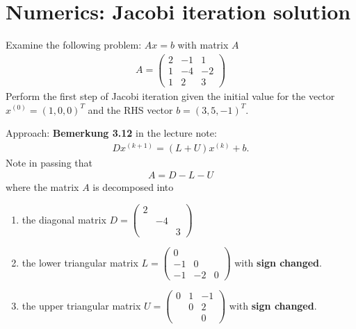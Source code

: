\documentclass[12pt]{article}
\begin{document}
\section{Numerics: Jacobi iteration solution}
\begin{example}
	Examine the following problem: $Ax = b$ with matrix $A$
	\begin{align}
		A =
		\begin{pmatrix}
			2 & -1 & 1  \\
			1 & -4 & -2 \\
			1 & 2  & 3
		\end{pmatrix}
	\end{align}
	Perform the first step of Jacobi iteration given
	the initial value for the vector $x^{(0)} = (1, 0, 0)^T$
	and the RHS vector
	$b = (3, 5, -1)^T $.
\end{example}
Approach: \textbf{Bemerkung 3.12} in the lecture note:\\
\begin{align}
	\label{eq:Jacobiformular}
	\boxed{
		D x^{(k+1)} = (L+U)x^{(k)} + b.
	}
\end{align}
Note in passing that 
\begin{align}
	A = D - L - U
\end{align}
where the matrix $A$ is decomposed into 
\begin{enumerate}
	\item the diagonal matrix $
		      D = 
		      \begin{pmatrix}
			      2 &    &   \\
			        & -4 &   \\
			        &    & 3
		      \end{pmatrix}
	      $
	\item the lower triangular matrix $
		      L=
		      \begin{pmatrix}
			      0  &    &   \\
			      -1 & 0  &   \\
			      -1 & -2 & 0
		      \end{pmatrix}
	      $ with \textbf{sign changed}.
	\item the upper triangular matrix $
		      U =
		      \begin{pmatrix}
			      0 & 1 & -1 \\
			        & 0 & 2  \\
			        &   & 0
		      \end{pmatrix}
	      $ with \textbf{sign changed}.
\end{enumerate}
\end{document}
